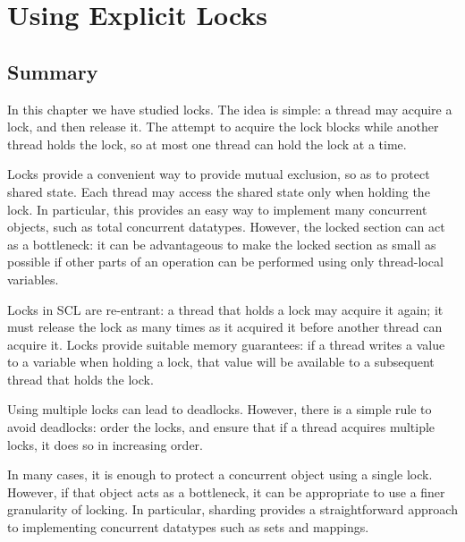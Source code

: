 \chapter{Using Explicit Locks} 
\label{chap:locks}



\section{Summary}

In this chapter we have studied locks.  The idea is simple: a thread may
acquire a lock, and then release it.  The attempt to acquire the lock blocks
while another thread holds the lock, so at most one thread can hold the lock
at a time.

Locks provide a convenient way to provide mutual exclusion, so as to protect
shared state.  Each thread may access the shared state only when holding the
lock.  In particular, this provides an easy way to implement many concurrent
objects, such as total concurrent datatypes.  However, the locked section can
act as a bottleneck: it can be advantageous to make the locked section as
small as possible if other parts of an operation can be performed using only
thread-local variables.

Locks in SCL are re-entrant: a thread that holds a lock may acquire it again;
it must release the lock as many times as it acquired it before another thread
can acquire it.  Locks provide suitable memory guarantees: if a thread writes
a value to a variable when holding a lock, that value will be available to a
subsequent thread that holds the lock.

Using multiple locks can lead to deadlocks.  However, there is a simple rule
to avoid deadlocks: order the locks, and ensure that if a thread acquires
multiple locks, it does so in increasing order.

In many cases, it is enough to protect a concurrent object using a single
lock.  However, if that object acts as a bottleneck, it can be appropriate
to use a finer granularity of locking.  In particular, sharding provides a
straightforward approach to implementing concurrent datatypes such as sets and
mappings. 


